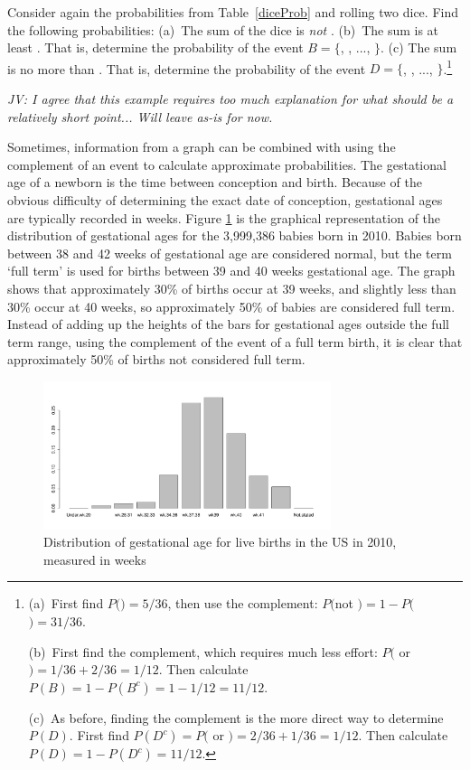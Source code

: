 \begin{doublespace}
\begin{exercise} Consider again the probabilities from Table~\ref{diceProb} and rolling two dice. Find the following probabilities: (a)~The sum of the dice is \emph{not} . (b)~The sum is at least . That is, determine the probability of the event $B=\{$, , ..., $\}$. (c) The sum is no more than . That is, determine the probability of the event $D=\{$, , ..., $\}$.\footnote{(a)~First find $P($$)=5/36$, then use the complement: $P($not $) = 1 - P($$) = 31/36$.

(b)~First find  the complement, which requires much less effort: $P($ or $)=1/36+2/36=1/12$. Then calculate $P(B) = 1-P(B^c) = 1-1/12 = 11/12$.

(c)~As before, finding the complement is the more direct way to determine $P(D)$. First find $P(D^c) = P($ or $)=2/36 + 1/36=1/12$. Then calculate $P(D) = 1 - P(D^c) = 11/12$.}
\end{exercise}

\textit{JV: I agree that this example requires too much explanation for what should be a relatively short point... Will leave as-is for now.}

Sometimes, information from a graph can be combined with using the complement of an event to calculate approximate probabilities. The gestational age of a newborn is the time between conception and birth. Because of the obvious difficulty of determining the exact date of conception, gestational ages are typically recorded in weeks. Figure \ref{fig:gestageMarginalDist} is the graphical representation of the distribution of gestational ages for the  3,999,386 babies born in 2010.  Babies born between 38 and 42 weeks of gestational age are considered normal, but the term `full term' is used for births between 39 and 40 weeks gestational age.  The graph shows that approximately 30\% of births occur at 39 weeks, and slightly less than 30\% occur at 40 weeks, so approximately 50\% of babies are considered full term.  Instead of adding up the heights of the bars for gestational ages outside the full term range, using the complement of the event of a full term birth, it is clear that approximately 50\% of births not considered full term.

\begin{figure}
  \centering
  \includegraphics[width=0.75\textwidth]{ch_probability_oi_biostat/figures/gestageMarginalDist/gestageMarginalDist.pdf}
  \caption{Distribution of gestational age for live births in the US in 2010, measured in weeks}
  \label{fig:gestageMarginalDist}
\end{figure}


\end{doublespace}
